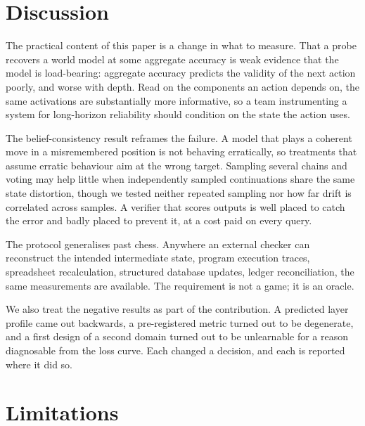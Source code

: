 \documentclass[11pt]{article}
\theoremstyle{remark}
\begin{document}
\section{Discussion}

The practical content of this paper is a change in what to measure. That a probe
recovers a world model at some aggregate accuracy is weak evidence that the model
is load-bearing: aggregate accuracy predicts the validity of the next action
poorly, and worse with depth. Read on the components an action depends on, the
same activations are substantially more informative, so a team instrumenting a
system for long-horizon reliability should condition on the state the action
uses.

The belief-consistency result reframes the failure. A model that plays a coherent
move in a misremembered position is not behaving erratically, so treatments that
assume erratic behaviour aim at the wrong target. Sampling several chains and
voting may help little when independently sampled continuations share the same
state distortion, though we tested neither repeated sampling nor how far drift is
correlated across samples. A verifier that scores outputs is well placed to catch
the error and badly placed to prevent it, at a cost paid on every query.

The protocol generalises past chess. Anywhere an external checker can reconstruct
the intended intermediate state, program execution traces, spreadsheet
recalculation, structured database updates, ledger reconciliation, the same
measurements are available. The requirement is not a game; it is an oracle.

We also treat the negative results as part of the contribution. A predicted layer
profile came out backwards, a pre-registered metric turned out to be degenerate,
and a first design of a second domain turned out to be unlearnable for a reason
diagnosable from the loss curve. Each changed a decision, and each is reported
where it did so.

\section{Limitations}
\label{sec:limits}
\end{document}
